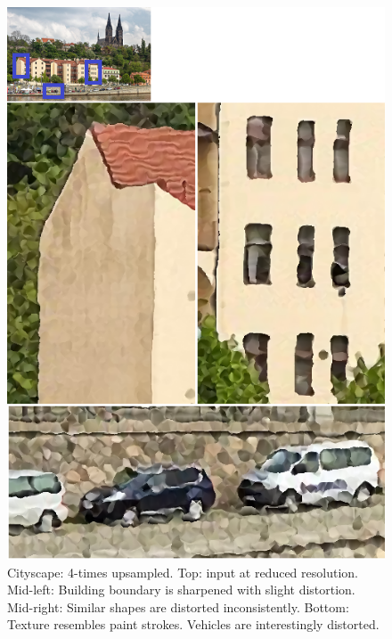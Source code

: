\begin{figure}[htbp]\centering
\includegraphics{imagesPM/f8.png}
\caption{Cityscape: 4-times upsampled. Top: input at reduced resolution. Mid-left: Building boundary is sharpened with slight distortion. Mid-right: Similar shapes are distorted inconsistently. Bottom: Texture resembles paint strokes. Vehicles are interestingly distorted. }
\label{fig:genCity}
\end{figure}

